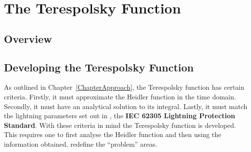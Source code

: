 
\chapter{The Terespolsky Function} %

\label{ChapterTeres} %

\begin{quote}
\end{quote}


\section{Overview}
\label{sec:overview}


\section{Developing the Terespolsky Function}
\label{sec:developing_the_}

As outlined in Chapter~\ref{ChapterApproach}, the Terespolsky function has certain criteria. Firstly, it must approximate the Heidler function in the time domain. Secondly, it must have an analytical solution to its integral. Lastly, it must match the lightning parameters set out in \cite{IEC623051}, the \textbf{IEC 62305 Lightning Protection Standard}. With these criteria in mind the Terespolsky function is developed. This requires one to first analyse the Heidler function and then using the information obtained, redefine the ``problem'' areas.

